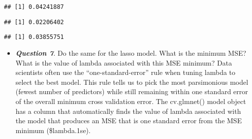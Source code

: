 \documentclass[
]{article}
\newenvironment{Shaded}{\begin{snugshade}}{\end{snugshade}}
\newcommand{\CommentTok}[1]{\textcolor[rgb]{0.56,0.35,0.01}{\textit{#1}}}
\newcommand{\FloatTok}[1]{\textcolor[rgb]{0.00,0.00,0.81}{#1}}
\newcommand{\FunctionTok}[1]{\textcolor[rgb]{0.00,0.00,0.00}{#1}}
\newcommand{\NormalTok}[1]{#1}
\newcommand{\SpecialCharTok}[1]{\textcolor[rgb]{0.00,0.00,0.00}{#1}}
\providecommand{\tightlist}{%
  \setlength{\itemsep}{0pt}\setlength{\parskip}{0pt}}
\begin{document}
\begin{Shaded}
\end{Shaded}

\begin{verbatim}
## [1] 0.04241887
\end{verbatim}

\begin{Shaded}
\end{Shaded}

\begin{verbatim}
## [1] 0.02206402
\end{verbatim}

\begin{Shaded}
\end{Shaded}

\begin{verbatim}
## [1] 0.03855751
\end{verbatim}

\begin{itemize}
\tightlist
\item
  \textbf{\emph{Question 7}}. Do the same for the lasso model. What is
  the minimum MSE? What is the value of lambda associated with this MSE
  minimum? Data scientists often use the ``one-standard-error'' rule
  when tuning lambda to select the best model. This rule tells us to
  pick the most parsimonious model (fewest number of predictors) while
  still remaining within one standard error of the overall minimum cross
  validation error. The cv.glmnet() model object has a column that
  automatically finds the value of lambda associated with the model that
  produces an MSE that is one standard error from the MSE minimum
  (\$lambda.1se).
\end{itemize}

\begin{Shaded}
\end{Shaded}
\end{document}
